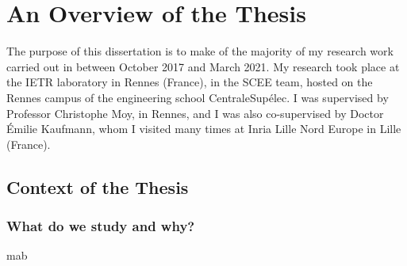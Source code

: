 \chapter{An Overview of the Thesis}\label{chap:intro}
	\minitoc
	\newpage





The purpose of this dissertation is to make  of the majority of my research work carried out in between October 2017 and March 2021. My research took place at the IETR laboratory in Rennes (France), in the SCEE team, hosted on the Rennes campus of the engineering school CentraleSupélec. I was supervised by Professor Christophe Moy, in Rennes, and I was also co-supervised by Doctor Émilie Kaufmann, whom I visited many times at Inria Lille Nord Europe in Lille (France).

\section{Context of the Thesis}\label{sec:intro.context}
	
\subsection{What do we study and why?}\label{sec:intro.context.what}
	    
	\gls{mab}



